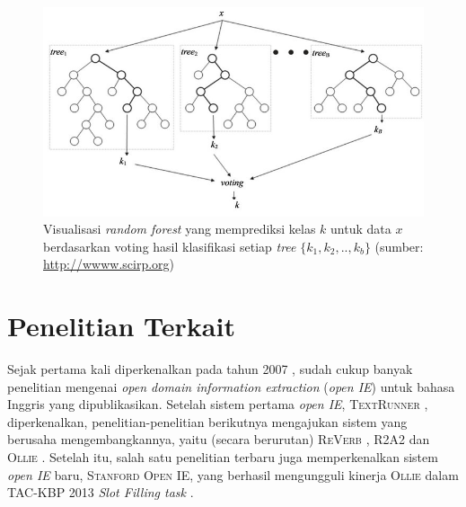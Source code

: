 \begin{figure}
\centering
\includegraphics[scale=0.5]{../images/random-forest.png}
\caption{Visualisasi \textit{random forest} yang memprediksi kelas $k$ untuk data $x$ berdasarkan voting hasil klasifikasi setiap \textit{tree} $\{k_1, k_2, .., k_b\}$ (sumber: \url{http://wwww.scirp.org})}
\label{fig:random-forest}
\end{figure}


\section{Penelitian Terkait}

Sejak pertama kali diperkenalkan pada tahun 2007 \citep{banko2007open}, sudah cukup banyak penelitian mengenai \textit{open domain information extraction} (\textit{open IE}) untuk bahasa Inggris yang dipublikasikan. Setelah sistem pertama \textit{open IE}, \textsc{TextRunner} \citep{banko2007open}, diperkenalkan, penelitian-penelitian berikutnya mengajukan sistem yang berusaha mengembangkannya, yaitu (secara berurutan) \textsc{ReVerb} \citep{fader2011identifying}, \textsc{R2A2} \citep{etzioni2011open} dan \textsc{Ollie} \citep{schmitz2012open}. Setelah itu, salah satu penelitian terbaru juga memperkenalkan sistem \textit{open IE} baru, \textsc{Stanford Open IE}, yang berhasil mengungguli kinerja \textsc{Ollie} dalam TAC-KBP 2013 \textit{Slot Filling task} \citep{angeli2015leveraging}.

